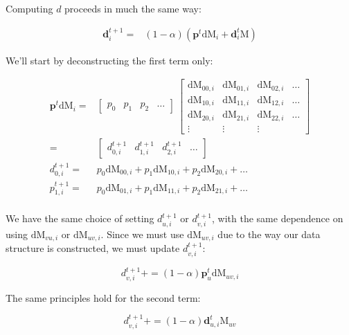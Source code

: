 \documentclass[12pt]{article}
\newcommand{\vek}[1]{\textbf{#1}}
\newcommand{\M}{\textrm{M}}
\newcommand{\dM}{\textrm{dM}}
\begin{document}
\begin{appendix}
Computing $d$ proceeds in much the same way:

\begin{align*}
\vek{d}^{t+1}_i =& (1-\alpha)(\vek{p}^t \dM_i + \vek{d}^t_i \M)
\end{align*}

We'll start by deconstructing the first term only:

\begin{align*}
\vek{p}^t \dM_i =& \left[ \begin{array}{cccc} p_0 & p_1 & p_2 & \ldots \end{array} \right] \
\left[ \begin{array}{cccc}
\dM_{00,i} & \dM_{01,i} & \dM_{02,i} & \ldots \\
\dM_{10,i} & \dM_{11,i} & \dM_{12,i} & \ldots \\
\dM_{20,i} & \dM_{21,i} & \dM_{22,i} & \ldots \\
\vdots & \vdots & \vdots
\end{array} \right]\\
=& \left[ \begin{array}{cccc} d^{t+1}_{0,i} & d^{t+1}_{1,i} & d^{t+1}_{2,i} & \ldots \end{array} \right]\\
d^{t+1}_{0,i} =& p_0 \dM_{00,i} + p_1 \dM_{10,i} + p_2 \dM_{20,i} + \ldots\\
p^{t+1}_{1,i} =& p_0 \dM_{01,i} + p_1 \dM_{11,i} + p_2 \dM_{21,i} + \ldots\\
\end{align*}

We have the same choice of setting $d^{t+1}_{u,i}$ or $d^{t+1}_{v,i}$, with the same dependence on using $\dM_{vu,i}$ or $\dM_{uv,i}$. Since we must use $\dM_{uv,i}$ due to the way our data structure is constructed, we must update $d^{t+1}_{v,i}$:

$$ d^{t+1}_{v,i} += (1-\alpha) \vek{p}^t_u \dM_{uv,i} $$

The same principles hold for the second term:

$$ d^{t+1}_{v,i} += (1-\alpha) \vek{d}^t_{u,i} \M_{uv} $$

\end{appendix}
\end{document}
